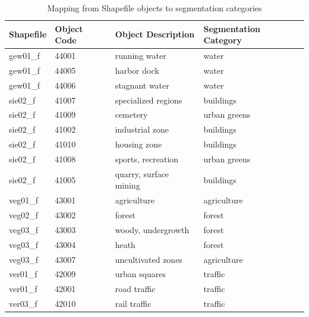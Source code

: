 \begin{table}[]
\centering
\small
\caption{Mapping from Shapefile objects to segmentation categories}
\label{tab:category_mapping}
\begin{tabular}{|l|l|l|l|}
\hline
\textbf{Shapefile} & \textbf{Object Code} & \textbf{Object Description}    & \textbf{Segmentation Category} \\ \hline
gew01\_f           & 44001                & running water                  & water                          \\ \hline
gew01\_f           & 44005                & harbor dock                    & water                          \\ \hline
gew01\_f           & 44006                & stagnant water                 & water                          \\ \hline
sie02\_f           & 41007                & specialized regions            & buildings                      \\ \hline
sie02\_f           & 41009                & cemetery                       & urban greens                   \\ \hline
sie02\_f           & 41002                & industrial zone                & buildings                      \\ \hline
sie02\_f           & 41010                & housing zone                   & buildings                      \\ \hline
sie02\_f           & 41008                & sports, recreation          & urban greens                   \\ \hline
sie02\_f           & 41005                & quarry, surface mining         & buildings                      \\ \hline
veg01\_f           & 43001                & agriculture                    & agriculture                    \\ \hline
veg02\_f           & 43002                & forest                         & forest                         \\ \hline
veg03\_f           & 43003                & woody, undergrowth             & forest                         \\ \hline
veg03\_f           & 43004                & heath                          & forest                         \\ \hline
veg03\_f           & 43007                & uncultivated zones             & agriculture                    \\ \hline
ver01\_f           & 42009                & urban squares                  & traffic                        \\ \hline
ver01\_f           & 42001                & road traffic                   & traffic                        \\ \hline
ver03\_f           & 42010                & rail traffic                   & traffic                        \\ \hline
\end{tabular}
\end{table}

